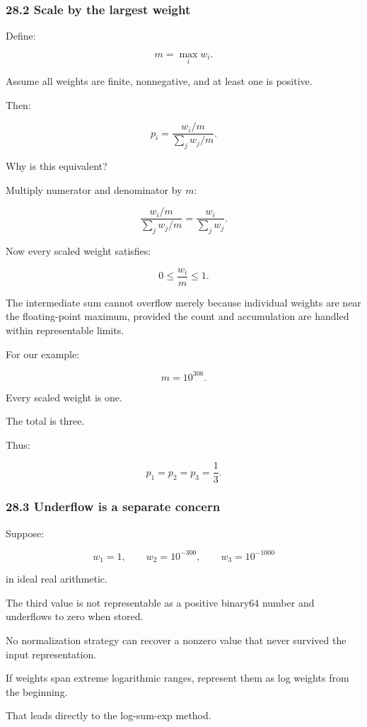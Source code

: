 \subsubsection{28.2 Scale by the largest weight}\label{scale-by-the-largest-weight}

Define:

\[ \boxed{ m=\max_iw_i }. \]

Assume all weights are finite, nonnegative, and at least one is positive.

Then:

\[ p_i= \frac{w_i/m}{\sum_jw_j/m}. \]

Why is this equivalent?

Multiply numerator and denominator by \(m\):

\[ \frac{w_i/m}{\sum_jw_j/m} = \frac{w_i}{\sum_jw_j}. \]

Now every scaled weight satisfies:

\[ 0\le\frac{w_i}{m}\le1. \]

The intermediate sum cannot overflow merely because individual weights are near the floating-point maximum, provided the count and accumulation are handled within representable limits.

For our example:

\[ m=10^{308}. \]

Every scaled weight is one.

The total is three.

Thus:

\[ \boxed{ p_1=p_2=p_3=\frac13 }. \]

\subsubsection{28.3 Underflow is a separate concern}\label{underflow-is-a-separate-concern}

Suppose:

\[ w_1=1, \qquad w_2=10^{-300}, \qquad w_3=10^{-1000} \]

in ideal real arithmetic.

The third value is not representable as a positive binary64 number and underflows to zero when stored.

No normalization strategy can recover a nonzero value that never survived the input representation.

If weights span extreme logarithmic ranges, represent them as log weights from the beginning.

That leads directly to the log-sum-exp method.

